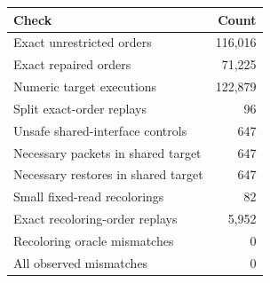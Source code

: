 \begin{tabular}{lr}
\toprule
Check & Count\\
\midrule
Exact unrestricted orders & 116,016\\
Exact repaired orders & 71,225\\
Numeric target executions & 122,879\\
Split exact-order replays & 96\\
Unsafe shared-interface controls & 647\\
Necessary packets in shared target & 647\\
Necessary restores in shared target & 647\\
Small fixed-read recolorings & 82\\
Exact recoloring-order replays & 5,952\\
Recoloring oracle mismatches & 0\\
All observed mismatches & 0\\
\bottomrule
\end{tabular}
